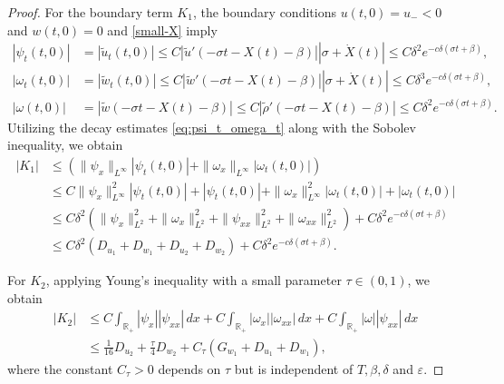 \documentclass[10pt,a4paper]{amsart}
\begin{document}
\begin{proof}
For the boundary term $K_1$, the boundary conditions $u(t,0) = u_- < 0$ and $w(t,0) = 0$ and \eqref{small-X} imply
\begin{equation} \label{eq:psi_t_omega_t}
    \begin{aligned}
        |\psi_t(t,0)| &= |\tilde{u}_t(t,0)| \le C | \tilde{u}'(-\sigma t -X(t) -\beta)||\sigma + \dot{X}(t)|\le C \delta^2 e^{-c\delta ( \sigma t +\beta)},\\
        |\omega_t(t,0)| &= |\tilde{w}_t(t,0)| \le C | \tilde{w}'(-\sigma t -X(t) -\beta)||\sigma + \dot{X}(t)|\le C \delta^3 e^{-c\delta ( \sigma t +\beta)},\\
        |\omega(t,0)| &= |\tilde{w}(-\sigma t-X(t)-\beta)| \le C|\tilde{\rho}'(-\sigma t -X(t) -\beta)|\le C \delta^2 e^{-c\delta ( \sigma t +\beta)}.
    \end{aligned}
\end{equation}
Utilizing the decay estimates \eqref{eq:psi_t_omega_t} along with the Sobolev inequality, we obtain
\begin{equation*}
\begin{aligned}
|K_1| &\le \left( \| \psi_x\|_{L^\infty} |\psi_t(t,0)|  + \| \omega_x\|_{L^\infty} | \omega_t(t,0)|\right) \\
&\le C \|\psi_x\|_{L^\infty}^2|\psi_t(t,0)|+|\psi_t(t,0)| +\|\omega_x\|_{L^\infty}^2|\omega_t(t,0)|+ |\omega_t(t,0)|\\
&\le C  \delta^2\left( \|\psi_x\|_{L^2}^2+ \|\omega_x\|_{L^2}^2 +\|\psi_{xx}\|_{L^2}^2+\|\omega_{xx}\|_{L^2}^2 \right) + C\delta^2 e^{-c\delta(\sigma t+ \beta)} \\
&\le C \delta^2 (D_{u_1}+D_{w_1}+D_{u_2}+D_{w_2})+ C\delta^2 e^{-c\delta(\sigma t+ \beta)}.
\end{aligned}
\end{equation*}



For $K_2$, applying Young's inequality with a small parameter $\tau \in (0,1)$, we obtain
\begin{equation*}
\begin{aligned}
|K_2| &\le C \int_{\mathbb{R}_+} |\psi_x | | \psi_{xx} | \, dx + C \int_{\mathbb{R}_+} | \omega_x | | \omega_{xx} | \, dx + C \int_{\mathbb{R}_+} | \omega | | \psi_{xx} | \, dx \\
&\le \frac{1}{16} D_{u_2} + \frac{\tau}{4} D_{w_2} + C_\tau (G_{w_1} + D_{u_1} + D_{w_1}),
\end{aligned}
\end{equation*}
where the constant $C_\tau>0$ depends on $\tau$ but is independent of $T,\beta, \delta$ and $\varepsilon$.



\end{proof}
\end{document}
